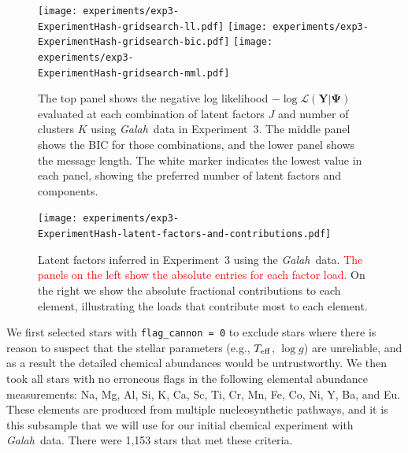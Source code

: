 \documentclass[twocolumn]{aastex62}
\newcommand\teff{T_{\rm eff}}
\newcommand\logg{\log{g}}
\newcommand{\project}[1]{\textsl{#1}}
\newcommand{\Galah}{\project{Galah}}
\newcommand{\todo}[1]{\textcolor{red}{#1}}
\newcommand{\vect}[1]{\boldsymbol{\mathbf{#1}}}
\renewcommand{\vec}[1]{\vect{#1}}
\newcommand{\data}{\textbf{Y}}
\newcommand{\NumLatentFactors}{J}
\newcommand{\NumComponents}{K}
\newcommand{\ExperimentHash}{96ff8}
\begin{document}
\begin{figure}
	\texttt{[image: experiments/exp3-\\ExperimentHash-gridsearch-ll.pdf]}
	\texttt{[image: experiments/exp3-\\ExperimentHash-gridsearch-bic.pdf]}
	\texttt{[image: experiments/exp3-\\ExperimentHash-gridsearch-mml.pdf]}
    \caption{The top panel shows the negative log likelihood 
			 $-\log{\mathcal{L}\left(\data|\vec\Psi\right)}$ 
			 evaluated at each combination of latent factors 
			 $\NumLatentFactors$ and number of clusters 
			 $\NumComponents$ using \Galah\ data in
			 Experiment~3.  The middle panel shows 
			 the BIC for those combinations, and the lower panel shows the 
			 message length. The white marker indicates the
			 lowest value in each panel, showing the
			 preferred number of latent factors and components.}
    \label{fig:exp3-gridsearch}
\end{figure}

\begin{figure}
	\texttt{[image: experiments/exp3-\\ExperimentHash-latent-factors-and-contributions.pdf]}
	\caption{Latent factors inferred in Experiment~3 using the \Galah\
			 data. \todo{The panels on the left show the absolute entries for each
			 factor load.} On the right we show the absolute fractional contributions
			 to each element, illustrating the loads that contribute most to each
			 element.}
    \label{fig:exp3-factor-loads}
\end{figure}



We first selected stars with \texttt{flag\_cannon = 0} to exclude
stars where there is reason to suspect that the stellar parameters
(e.g., $\teff$, $\logg$) are unreliable, and as a result the 
detailed chemical abundances would be untrustworthy. We then took all
stars with no erroneous flags in the following elemental abundance
measurements: Na, Mg, Al, Si, K, Ca, Sc, Ti, Cr, Mn, Fe, Co, Ni, Y, Ba, and Eu.
These elements are produced from multiple nucleosynthetic
pathways, and it is this subsample that we will use for 
our initial chemical experiment with \Galah\ data.
There were 1,153 stars that met these criteria. 

\end{document}
